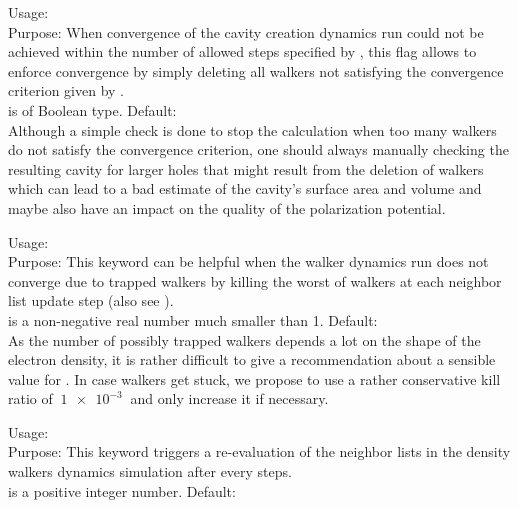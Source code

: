 {
  \noindent
  Usage:   \\[1.0ex] 
  Purpose: When convergence of the cavity creation dynamics run 
    could not be achieved within the number of allowed steps 
    specified by , this flag allows 
    to enforce convergence by simply deleting all walkers 
    not satisfying the convergence criterion given by 
    . \\[1.0ex]
   is of Boolean type. Default:  \\
}
Although a simple check is done to stop the calculation when 
too many walkers do not satisfy the convergence criterion, one 
should always manually checking the resulting cavity for 
larger holes that might result from the deletion of walkers 
which can lead to a bad estimate of the cavity's surface area 
and volume and maybe also have an impact on the quality of 
the polarization potential. 

{
  \noindent
  Usage:   \\[1.0ex] 
  Purpose: This keyword can be helpful when the walker 
    dynamics run does not converge due to trapped walkers 
    by killing the worst  of walkers 
    at each neighbor list update step (also see 
    ). \\[1.0ex]
   is a non-negative real number
    much smaller than 1. Default:  \\
}
As the number of possibly trapped walkers depends a lot 
on the shape of the electron density, it is rather 
difficult to give a recommendation about a sensible 
value for . In case walkers 
get stuck, we propose to use a rather conservative 
kill ratio of $~\SI{1e-3}{}$ and only increase it 
if necessary. 

{
  \noindent
  Usage:   \\[1.0ex] 
  Purpose: This keyword triggers a re-evaluation of the 
    neighbor lists in the density walkers dynamics simulation 
    after every  steps. \\[1.0ex]
   is a positive integer number. Default:  \\
}

